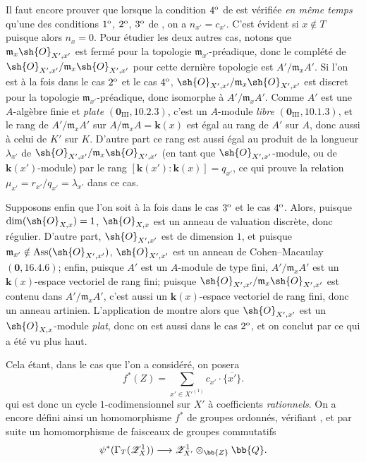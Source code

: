 \begin{env}[21.10.11]
\label{IV.21.10.11}
Il faut encore prouver que lorsque la condition $4\textsuperscript{o}$ de  est vérifiée \emph{en même temps} qu'une des conditions $1\textsuperscript{o}$, $2\textsuperscript{o}$, $3\textsuperscript{o}$ de , on a $n_{x'}=c_{x'}$.
C'est évident si $x\notin T$ puisque alors $n_x=0$.
Pour étudier les deux autres cas, notons que $\mathfrak{m}_x\sh{O}_{X',x'}$ est fermé pour la topologie $\mathfrak{m}_{x'}$-préadique, donc le complété de $\sh{O}_{X',x'}/\mathfrak{m}_x\sh{O}_{X',x'}$ pour cette dernière topologie est $A'/\mathfrak{m}_xA'$.
Si l'on est à la fois dans le cas $2\textsuperscript{o}$ et le cas $4\textsuperscript{o}$, $\sh{O}_{X',x'}/\mathfrak{m}_x\sh{O}_{X',x'}$ est discret pour la topologie $\mathfrak{m}_{x'}$-préadique, donc isomorphe à $A'/\mathfrak{m}_xA'$.
Comme $A'$ est une $A$-algèbre finie et \emph{plate} $(\mathbf{0}_{\mathrm{III}},10.2.3)$, c'est un $A$-module \emph{libre} $(\mathbf{0}_{\mathrm{III}},10.1.3)$, et le rang de $A'/\mathfrak{m}_xA'$ sur $A/\mathfrak{m}_xA=\boldsymbol{k}(x)$ est égal au rang de $A'$ sur $A$, donc aussi à celui de $K'$ sur $K$.
D'autre part ce rang est aussi égal au produit de la longueur $\lambda_{x'}$ de $\sh{O}_{X',x'}/\mathfrak{m}_x\sh{O}_{X',x'}$ (en tant que $\sh{O}_{X',x'}$-module, ou de $\boldsymbol{k}(x')$-module) par le rang $[\boldsymbol{k}(x'): \boldsymbol{k}(x)]=q_{x'}$, ce qui prouve la relation $\mu_{x'}=r_{x'}/q_{x'}=\lambda_{x'}$ dans ce cas.

Supposons enfin que l'on soit à la fois dans le cas $3\textsuperscript{o}$ et le cas $4\textsuperscript{o}$.
Alors, puisque $\dim(\sh{O}_{X,x})=1$, $\sh{O}_{X,x}$ est un anneau de valuation discrète, donc régulier.
D'autre part, $\sh{O}_{X',x'}$ est de dimension $1$, et puisque $\mathfrak{m}_{x'}\notin\operatorname{Ass}(\sh{O}_{X',x'})$, $\sh{O}_{X',x'}$ est un anneau de Cohen--Macaulay $(\mathbf{0},16.4.6)$;
enfin, puisque $A'$ est un $A$-module de type fini, $A'/\mathfrak{m}_xA'$ est un $\boldsymbol{k}(x)$-espace vectoriel de rang fini;
puisque $\sh{O}_{X',x'}/\mathfrak{m}_x\sh{O}_{X',x'}$ est contenu dans $A'/\mathfrak{m}_xA'$, c'est aussi un $\boldsymbol{k}(x)$-espace vectoriel de rang fini, donc un anneau artinien.
L'application de  montre alors que $\sh{O}_{X',x'}$ est un $\sh{O}_{X,x}$-module \emph{plat}, donc on est aussi dans le cas $2\textsuperscript{o}$, et on conclut par ce qui a été vu plus haut.

Cela étant, dans le cas que l'on a considéré, on posera
\[
  f^*(Z)=\sum_{x'\in X'^{(1)}}c_{x'}\cdot\overline{\{x'\}}.
\]
qui est donc un cycle $1$-codimensionnel sur $X'$ à coefficients \emph{rationnels}.
On a encore défini ainsi un homomorphisme $f^*$ de groupes ordonnés, vérifiant , et par suite un homomorphisme de faisceaux de groupes commutatifs
\[
  \psi^*(\Gamma_T(\mathscr{Z}^1_X))\to\mathscr{Z}^1_{X'}\otimes_{\bb{Z}}\bb{Q}.
\]


\end{env}
